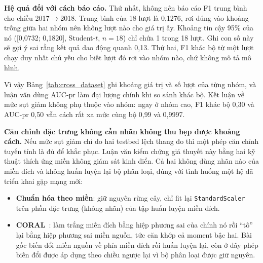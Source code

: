\textbf{Hệ quả đối với cách báo cáo.} Thứ nhất, không nên báo cáo F1 trung bình cho chiều 2017$\rightarrow$2018. Trung bình của 18 lượt là 0{,}1276, rơi đúng vào khoảng trống giữa hai nhóm nên không lượt nào cho giá trị ấy. Khoảng tin cậy 95\% của nó ([0{,}0732; 0{,}1820], Student-$t$, $n=18$) chỉ chứa 1 trong 18 lượt. Ghi con số này sẽ gợi ý sai rằng kết quả dao động quanh 0{,}13. Thứ hai, F1 khác bộ từ một lượt chạy duy nhất chủ yếu cho biết lượt đó rơi vào nhóm nào, chứ không mô tả mô hình.

Vì vậy Bảng~\ref{tab:cross_dataset} ghi khoảng giá trị và số lượt của từng nhóm, và luận văn dùng AUC-\ac{pr} làm đại lượng chính khi so sánh khác bộ. Kết luận về mức sụt giảm không phụ thuộc vào nhóm: ngay ở nhóm cao, F1 khác bộ 0{,}30 và AUC-\ac{pr} 0{,}50 vẫn cách rất xa mức cùng bộ 0{,}99 và 0{,}9997.

\textbf{Căn chỉnh đặc trưng không cần nhãn không thu hẹp được khoảng cách.} Nếu mức sụt giảm chỉ do hai testbed lệch thang đo thì một phép căn chỉnh tuyến tính là đủ để khắc phục. Luận văn kiểm chứng giả thuyết này bằng hai kỹ thuật thích ứng miền không giám sát kinh điển. Cả hai không dùng nhãn nào của miền đích và không huấn luyện lại bộ phân loại, đúng với tình huống một hệ đã triển khai gặp mạng mới:
\begin{itemize}
    \item \textbf{Chuẩn hóa theo miền}: giữ nguyên rừng cây, chỉ fit lại \texttt{StandardScaler} trên phần đặc trưng (không nhãn) của tập huấn luyện miền đích.
    \item \textbf{CORAL}~\cite{sun2016coral}: làm trắng miền đích bằng hiệp phương sai của chính nó rồi ``tô'' lại bằng hiệp phương sai miền nguồn, tức căn khớp cả moment bậc hai. Bài gốc biến đổi miền nguồn về phía miền đích rồi huấn luyện lại, còn ở đây phép biến đổi được áp dụng theo chiều ngược lại vì bộ phân loại được giữ nguyên.
\end{itemize}

